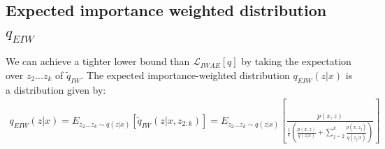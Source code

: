 \documentclass{article} %
\begin{document}











\subsection{Expected importance weighted distribution \texorpdfstring{ $q_{EIW}$}{} }

We can achieve a tighter lower bound than $\mathcal{L}_{IWAE}[q]$ by taking the expectation over $z_2 ... z_k$ of $\tilde{q}_{IW}$. The expected importance-weighted distribution $q_{EIW}(z|x)$ is a distribution given by:
\begin{align} 
    q_{EIW}(z|x)
    = E_{z_{2}...z_{k} \sim q(z|x)} \left[ \tilde{q}_{IW}(z|x,z_{2:k}) \right] 
    = E_{z_{2}...z_{k} \sim q(z|x)} \left[ \frac{p(x,z)}{  \frac{1}{k} \left( \frac{p(x,z)}{q(z|x)}+ \sum_{j=2}^k \frac{p(x,z_j)}{q(z_j|x)} \right) } \right] \label{marg} 
\end{align}
\end{document}
